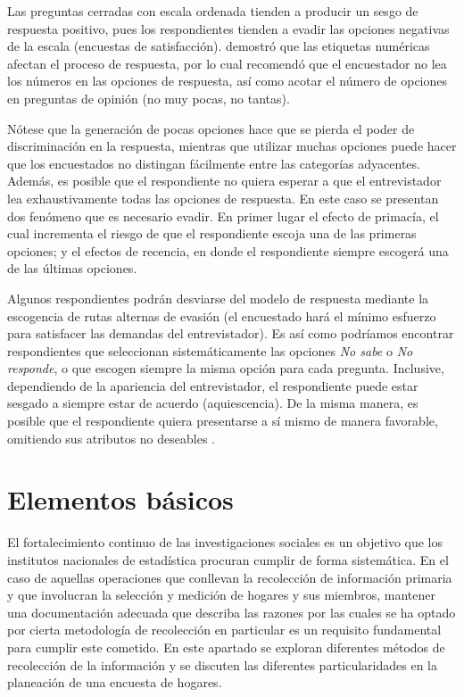 \documentclass[
  12pt,
  spanish,
]{book}
\begin{document}
Las preguntas cerradas con escala ordenada tienden a producir un sesgo de respuesta positivo, pues los respondientes tienden a evadir las opciones negativas de la escala (encuestas de satisfacción). \citet{Schwarz1991} demostró que las etiquetas numéricas afectan el proceso de respuesta, por lo cual recomendó que el encuestador no lea los números en las opciones de respuesta, así como acotar el número de opciones en preguntas de opinión (no muy pocas, no tantas).

Nótese que la generación de pocas opciones hace que se pierda el poder de discriminación en la respuesta, mientras que utilizar muchas opciones puede hacer que los encuestados no distingan fácilmente entre las categorías adyacentes. Además, es posible que el respondiente no quiera esperar a que el entrevistador lea exhaustivamente todas las opciones de respuesta. En este caso se presentan dos fenómeno que es necesario evadir. En primer lugar el efecto de primacía, el cual incrementa el riesgo de que el respondiente escoja una de las primeras opciones; y el efectos de recencia, en donde el respondiente siempre escogerá una de las últimas opciones.

Algunos respondientes podrán desviarse del modelo de respuesta mediante la escogencia de rutas alternas de evasión (el encuestado hará el mínimo esfuerzo para satisfacer las demandas del entrevistador). Es así como podríamos encontrar respondientes que seleccionan sistemáticamente las opciones \emph{No sabe} o \emph{No responde}, o que escogen siempre la misma opción para cada pregunta. Inclusive, dependiendo de la apariencia del entrevistador, el respondiente puede estar sesgado a siempre estar de acuerdo (aquiescencia). De la misma manera, es posible que el respondiente quiera presentarse a sí mismo de manera favorable, omitiendo sus atributos no deseables \citep{Groves_Fowler_Couper_Lepkowski_Singer_Tourangeau_2009}.

\hypertarget{elementos-buxe1sicos}{%
\chapter{Elementos básicos}\label{elementos-buxe1sicos}}

El fortalecimiento continuo de las investigaciones sociales es un objetivo que los institutos nacionales de estadística procuran cumplir de forma sistemática. En el caso de aquellas operaciones que conllevan la recolección de información primaria y que involucran la selección y medición de hogares y sus miembros, mantener una documentación adecuada que describa las razones por las cuales se ha optado por cierta metodología de recolección en particular es un requisito fundamental para cumplir este cometido. En este apartado se exploran diferentes métodos de recolección de la información y se discuten las diferentes particularidades en la planeación de una encuesta de hogares.
\end{document}

